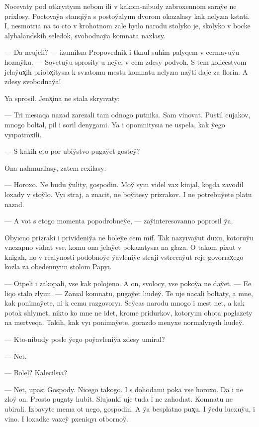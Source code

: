 \documentclass[10pt]{book}
\begin{document}
Nocevaty pod otkryıtyım nebom ili v kakom-nibudy zabroxennom saray̆e ne prixlosy. Poctovay̆a stanqiy̆a s postoy̆alyım dvorom okazalasy kak nelyzıa kstati. I, nesmotrıa na to cto v krohotnom zale byılo narodu stolyko je, skolyko v bocke alybalandskih seledok, svobodnay̆a komnata naxlasy.

— Da neujeli? — izumilsıa Propovednik i tknul suhim palyqem v cernıavuy̆u hozıay̆ku. — Sovetuy̆u sprosity u ney̆e, v cem zdesy podvoh. S tem kolicestvom jelay̆ux̨ih priobx̨itysıa k svıatomu mestu komnatu nelyzıa nay̆ti daje za florin. A zdesy svobodnay̆a!

Ya sprosil. Jenx̨ina ne stala skryıvaty:

— Tri mesıaqa nazad zarezali tam odnogo putnika. Sam vinovat. Pustil cujakov, mnogo boltal, pil i soril denygami. Ya i opomnitysıa ne uspela, kak y̆ego vyıpotroxili.

— S kakih eto por ubiy̆stvo pugay̆et gostey̆?

Ona nahmurilasy, zatem rexilasy:

— Horoxo. Ne budu y̆ulity, gospodin. Moy̆ syın videl vax kinjal, kogda zavodil loxady v stoy̆lo. Vyı straj, a znacit, ne boy̆itesy prizrakov. I ne potrebuy̆ete platu nazad.

— A vot s etogo momenta popodrobney̆e, — zay̆interesovanno poprosil y̆a.

Obyıcno prizraki i privideniy̆a ne boley̆e cem mif. Tak nazyıvay̆ut duxu, kotoruy̆u vnezapno vidıat vse, komu ona jelay̆et pokazatysıa na glaza. O takom pixut v knigah, no v realynosti podobnoy̆e y̆avleniy̆e straji vstrecay̆ut reje govorıax̨ego kozla za obedennyım stolom Papyı.

— Otpeli i zakopali, vse kak polojeno. A on, svolocy, vse pokoy̆a ne day̆et. — Ee liqo stalo zlyım. — Zanıal komnatu, pugay̆et lıudey̆. Te uje nacali boltaty, a mne, kak ponimay̆ete, ni k cemu razgovoryı. Sey̆cas narodu mnogo i mest net, a kak potok shlyınet, nikto ko mne ne idet, krome pridurkov, kotoryım ohota poglazety na mertveqa. Takih, kak vyı ponimay̆ete, gorazdo menyxe normalynyıh lıudey̆.

— Kto-nibudy posle y̆ego poy̆avleniy̆a zdesy umiral?

— Net.

— Bolel? Kalecilsıa?

— Net, upasi Gospody. Nicego takogo. I s dohodami poka vse horoxo. Da i ne zloy̆ on. Prosto pugaty lıubit. Slujanki uje tuda i ne zahodıat. Komnatu ne ubirali. Izbavyte menıa ot nego, gospodin. A y̆a besplatno pux̨u. I y̆edu lucxuy̆u, i vino. I loxadke vaxey̆ pxeniqyı otbornoy̆.
\end{document}
